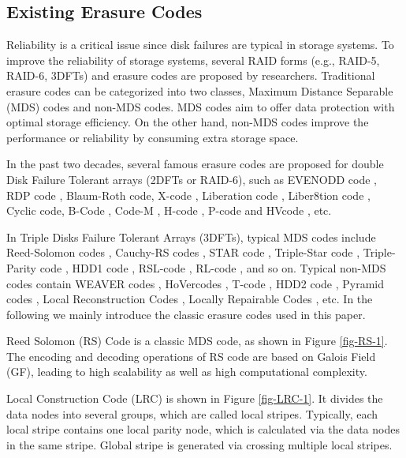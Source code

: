 \documentclass[sigconf]{acmart}
\begin{document}
\subsection{Existing Erasure Codes}\label{existEC}

Reliability is a critical issue since disk failures are typical in storage systems. To improve the reliability of storage systems, several RAID forms (e.g., RAID-5, RAID-6, 3DFTs) and erasure codes are proposed by researchers.  Traditional erasure codes can be categorized into two classes, Maximum Distance Separable (MDS) codes and non-MDS codes. MDS codes aim to offer data protection with optimal storage efficiency. On the other hand, non-MDS codes improve the performance or reliability by consuming extra storage space.

In the past two decades, several famous erasure codes are proposed for double Disk Failure Tolerant arrays (2DFTs or RAID-6), such as EVENODD code \cite{EVENODD}, RDP code \cite{RDP}, Blaum-Roth code\cite{BlaumRoth}, X-code \cite{XCode}, Liberation code \cite{Liberation}, Liber8tion code \cite{Liber8tion}, Cyclic \cite {Cyclic} code, B-Code \cite{BCode}, Code-M \cite{Code-M}, H-code \cite{hcode}, P-code \cite{PCode} and HVcode \cite{HVCode}, etc.

In Triple Disks Failure Tolerant Arrays (3DFTs), typical MDS codes include Reed-Solomon codes \cite{RS}, Cauchy-RS codes \cite{CRS}, STAR code \cite{STAR}, Triple-Star code \cite{TripleStar}, Triple-Parity code \cite{TPtech}, HDD1 code \cite{HDD}, RSL-code \cite{RSL}, RL-code \cite{RL}, and so on. Typical non-MDS codes contain WEAVER codes \cite{WEAVER}, HoVercodes \cite{HoVer}, T-code \cite{TCode}, HDD2 code \cite{HDD}, Pyramid codes \cite{Pyramid}, Local Reconstruction Codes \cite{LRC}, Locally Repairable Codes \cite{XORing}, etc.
In the following we mainly introduce the classic erasure codes used in this paper.

Reed Solomon (RS) Code \cite{RS} is a classic MDS code, as shown in Figure \ref{fig-RS-1}. The encoding and decoding operations of RS code are based on Galois Field (GF), leading to high scalability as well as high computational complexity.

Local Construction Code (LRC) \cite{LRC} 
is shown in Figure \ref{fig-LRC-1}. It divides the data nodes into several groups, which are called local stripes. Typically, each local stripe contains one local parity node, which is calculated via the data nodes in the same stripe. Global stripe is generated via crossing multiple local stripes.
\end{document}

